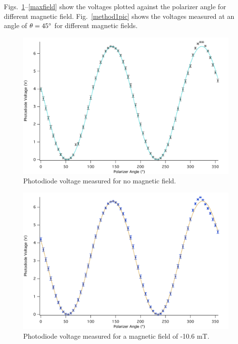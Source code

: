\documentclass[prb,preprint]{revtex4-1}
\begin{document}
{Figs.~\ref{nofield}--\ref{maxfield} show the voltages plotted against the polarizer angle for different magnetic field. Fig.~\ref{method1pic} shows the voltages measured at an angle of $\theta=45\degree$ for different magnetic fields. 
\begin{figure}[h]
\includegraphics[width = 5.8in]{0A.pdf}
\caption{\label{nofield}Photodiode voltage measured for no magnetic field.}
\end{figure}

\begin{figure}
\includegraphics[width = 5.8in]{n1A.pdf}
\caption{\label{neg}Photodiode voltage measured for a magnetic field of -10.6 mT.}
\end{figure}

}
\end{document}
